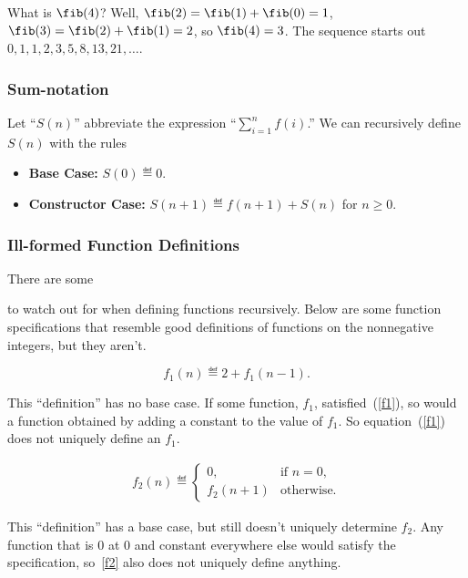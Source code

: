 What is $\fib(4)$?  Well, $\fib(2) =
\fib(1)+\fib(0) = 1$, $\fib(3) =
\fib(2)+\fib(1) = 2$, so $\fib(4) = 3$.  The sequence
starts out $0, 1, 1, 2, 3, 5, 8, 13, 21,\dots$.

\subsubsection{Sum-notation}

Let ``$S(n)$'' abbreviate the expression ``$\sum_{i=1}^n f(i)$.''  We
can recursively define $S(n)$ with the rules
\begin{itemize}
\item\textbf{Base Case:} $S(0) \eqdef 0$.
\item\textbf{Constructor Case:} $S(n+1) \eqdef  f(n+1) + S(n)$ for $n\geq 0$.
\end{itemize}

\subsubsection{Ill-formed Function Definitions}

There are some  to watch out for when
defining functions recursively.  Below are some function specifications
that resemble good definitions of functions on the nonnegative integers,
but they aren't.
\begin{definition}
\begin{equation}\label{f1}
f_1(n)\eqdef 2+f_1(n-1).
\end{equation}
\end{definition}
This ``definition'' has no base case.  If some function, $f_1$,
satisfied~(\ref{f1}), so would a function obtained by adding a constant to
the value of $f_1$.  So equation~(\ref{f1}) does not uniquely define
an $f_1$.

\begin{definition}
\begin{eqnarray}\label{f2}
f_2(n) \eqdef
\begin{cases}
 0, & \text{if $n=0$},\\
 f_2(n+1) &  \text{otherwise}.
\end{cases}
\end{eqnarray}
\end{definition}
This ``definition'' has a base case, but still doesn't uniquely determine
$f_2$.  Any function that is 0 at 0 and constant everywhere else would
satisfy the specification, so~\eqref{f2} also does not uniquely define
anything.

